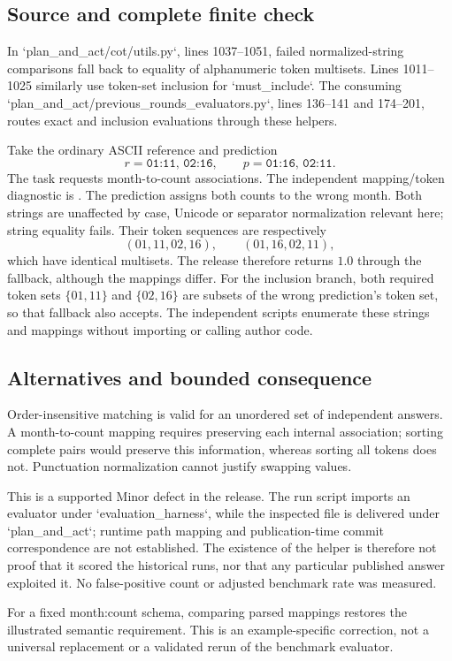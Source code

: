 \documentclass[10pt]{article}
\begin{document}
\subsection*{Source and complete finite check}
In `plan\_and\_act/cot/utils.py`, lines 1037–1051, failed normalized-string comparisons fall back to equality of alphanumeric token multisets. Lines 1011–1025 similarly use token-set inclusion for `must\_include`. The consuming `plan\_and\_act/previous\_rounds\_evaluators.py`, lines 136–141 and 174–201, routes exact and inclusion evaluations through these helpers.\par
Take the ordinary ASCII reference and prediction \[r=\texttt{01:11, 02:16},\qquad
p=\texttt{01:16, 02:11}.\] The task requests month-to-count associations. The independent mapping/token diagnostic is . The prediction assigns both counts to the wrong month. Both strings are unaffected by case, Unicode or separator normalization relevant here; string equality fails. Their token sequences are respectively \[(01,11,02,16),\qquad(01,16,02,11),\] which have identical multisets. The release therefore returns \(1.0\) through the fallback, although the mappings differ. For the inclusion branch, both required token sets \(\{01,11\}\) and \(\{02,16\}\) are subsets of the wrong prediction’s token set, so that fallback also accepts. The independent scripts enumerate these strings and mappings without importing or calling author code.\par
\subsection*{Alternatives and bounded consequence}
Order-insensitive matching is valid for an unordered set of independent answers. A month-to-count mapping requires preserving each internal association; sorting complete pairs would preserve this information, whereas sorting all tokens does not. Punctuation normalization cannot justify swapping values.\par
This is a supported Minor defect in the release. The run script imports an evaluator under `evaluation\_harness`, while the inspected file is delivered under `plan\_and\_act`; runtime path mapping and publication-time commit correspondence are not established. The existence of the helper is therefore not proof that it scored the historical runs, nor that any particular published answer exploited it. No false-positive count or adjusted benchmark rate was measured.\par
For a fixed month:count schema, comparing parsed mappings restores the illustrated semantic requirement. This is an example-specific correction, not a universal replacement or a validated rerun of the benchmark evaluator.\par
\end{document}
